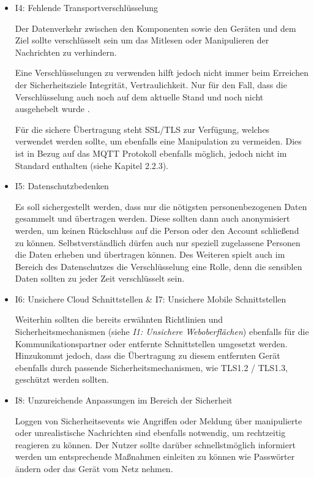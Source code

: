 \begin{itemize}
            \item I4: Fehlende Transportverschlüsselung
            
            Der Datenverkehr zwischen den Komponenten sowie den Geräten und dem Ziel sollte verschlüsselt sein um das Mitlesen oder Manipulieren der Nachrichten zu verhindern.
            
            Eine Verschlüsselungen zu verwenden hilft jedoch nicht immer beim Erreichen der Sicherheitsziele Integrität, Vertraulichkeit. Nur für den Fall, dass die Verschlüsselung auch noch auf dem aktuelle Stand und noch nicht ausgehebelt wurde \cite{bsi_2019}.
            
            Für die sichere Übertragung steht SSL/TLS zur Verfügung, welches verwendet werden sollte, um ebenfalls eine Manipulation zu vermeiden. Dies ist in Bezug auf das \ac{MQTT} Protokoll ebenfalls möglich, jedoch nicht im Standard enthalten (siehe Kapitel 2.2.3).
            
            \item I5: Datenschutzbedenken
            
            Es soll sichergestellt werden, dass nur die nötigsten personenbezogenen Daten gesammelt und übertragen werden. Diese sollten dann auch anonymisiert werden, um keinen Rückschluss auf die Person oder den Account schließend zu können.
            Selbstverständlich dürfen auch nur speziell zugelassene Personen die Daten erheben und übertragen können.
            Des Weiteren spielt auch im Bereich des Datenschutzes die Verschlüsselung eine Rolle, denn die sensiblen Daten sollten zu jeder Zeit verschlüsselt sein.
    
            \item I6: Unsichere Cloud Schnittstellen \& I7: Unsichere Mobile Schnittstellen
            
            Weiterhin sollten die bereits erwähnten Richtlinien und Sicherheitsmechanismen (siehe \emph{I1: Unsichere Weboberflächen}) ebenfalls für die Kommunikationspartner oder entfernte Schnittstellen umgesetzt werden. Hinzukommt jedoch, dass die Übertragung zu diesem entfernten Gerät ebenfalls durch passende Sicherheitsmechanismen, wie TLS1.2 / TLS1.3, geschützt werden sollten.
            
            \item I8: Unzureichende Anpassungen im Bereich der Sicherheit
            
            Loggen von Sicherheitsevents wie Angriffen oder Meldung über manipulierte oder unrealistische Nachrichten sind ebenfalls notwendig, um rechtzeitig reagieren zu können. Der Nutzer sollte darüber schnellstmöglich informiert werden um entsprechende Maßnahmen einleiten zu können wie Passwörter ändern oder das Gerät vom Netz nehmen.
            

\end{itemize}
